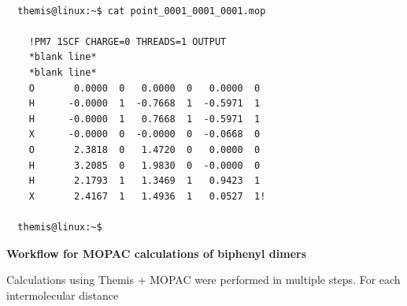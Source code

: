 \documentclass[10pt,a4paper]{report}
\begin{document}
\begin{center}
  \begin{minipage}{0.40\textwidth}
    \begin{verbatim}

  themis@linux:~$ cat point_0001_0001_0001.mop

    !PM7 1SCF CHARGE=0 THREADS=1 OUTPUT
    *blank line*
    *blank line*
    O       0.0000  0   0.0000  0   0.0000  0
    H      -0.0000  1  -0.7668  1  -0.5971  1
    H      -0.0000  1   0.7668  1  -0.5971  1
    X      -0.0000  0  -0.0000  0  -0.0668  0
    O       2.3818  0   1.4720  0   0.0000  0
    H       3.2085  0   1.9830  0  -0.0000  0 
    H       2.1793  1   1.3469  1   0.9423  1
    X       2.4167  1   1.4936  1   0.0527  1!

  themis@linux:~$ 

    \end{verbatim}
    \vskip0.25cm
  \end{minipage}%
\end{center}

\clearpage

\begin{center}
  \textbf{\large{Workflow for MOPAC calculations of biphenyl dimers}}
\end{center}

  Calculations using Themis + MOPAC were performed in multiple steps. For each
  intermolecular distance
\end{document}
